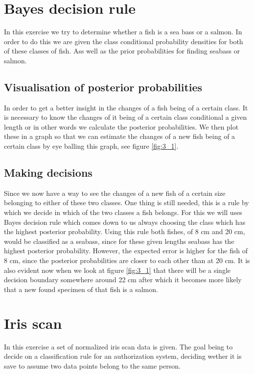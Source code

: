 \documentclass[10pt,a4paper]{article}
\begin{document}
\section{Bayes decision rule}
In this exercise we try to determine whether a fish is a sea bass or a salmon. In order to do this we are given the class conditional probability densities for both of these classes of fish. Ass well as the prior probabilities for finding seabass or salmon.

\subsection{Visualisation of posterior probabilities}
In order to get a better insight in the changes of a fish being of a certain class. It is necessary to know the changes of it being of a certain class conditional a given length or in other words we calculate the posterior probabilities. We then plot these in a graph so that we can estimate the changes of a new fish being of a certain class by eye balling this graph, see figure \ref{fig:3_1}.

\subsection{Making decisions}
Since we now have a way to see the changes of a new fish of a certain size belonging to either of these two classes. One thing is still needed, this is a rule by which we decide in which of the two classes a fish belongs. For this we will uses Bayes decision rule which comes down to us always choosing the class which has the highest posterior probability. Using this rule both fishes, of 8 cm and 20 cm, would be classified as a seabass, since for these given lengths seabass has the highest posterior probability. However, the expected error is higher for the fish of 8 cm, since the posterior probabilities are closer to each other than at 20 cm. It is also evident now when we look at figure \ref{fig:3_1} that there will be a single decision boundary somewhere around 22 cm after which it becomes more likely that a new found specimen of that fish is a salmon.

\section{Iris scan}
In this exercise a set of normalized iris scan data is given. The goal being to decide on a classification rule for an authorization system, deciding wether it is save to assume two data points belong to the same person.
\end{document}
